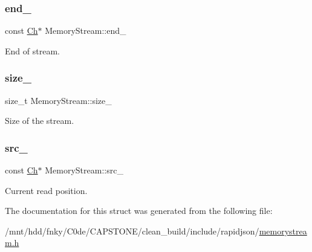 \subsubsection{\texorpdfstring{end\+\_\+}{end\_}}
{\footnotesize\ttfamily const \hyperlink{structMemoryStream_a62a1cbd052c325c83dbdb387d2f89088}{Ch}$\ast$ Memory\+Stream\+::end\+\_\+}



End of stream. 

\mbox{\label{structMemoryStream_ab26a1b5c6d5e8f52c0f6982feba47f36}} 
\subsubsection{\texorpdfstring{size\+\_\+}{size\_}}
{\footnotesize\ttfamily size\+\_\+t Memory\+Stream\+::size\+\_\+}



Size of the stream. 

\mbox{\label{structMemoryStream_a57cf6cb5766e931a62928b9f92507443}} 
\subsubsection{\texorpdfstring{src\+\_\+}{src\_}}
{\footnotesize\ttfamily const \hyperlink{structMemoryStream_a62a1cbd052c325c83dbdb387d2f89088}{Ch}$\ast$ Memory\+Stream\+::src\+\_\+}



Current read position. 



The documentation for this struct was generated from the following file\+:\begin{DoxyCompactItemize}
\item 
/mnt/hdd/fnky/\+C0de/\+C\+A\+P\+S\+T\+O\+N\+E/clean\+\_\+build/include/rapidjson/\hyperlink{memorystream_8h}{memorystream.\+h}\end{DoxyCompactItemize}
